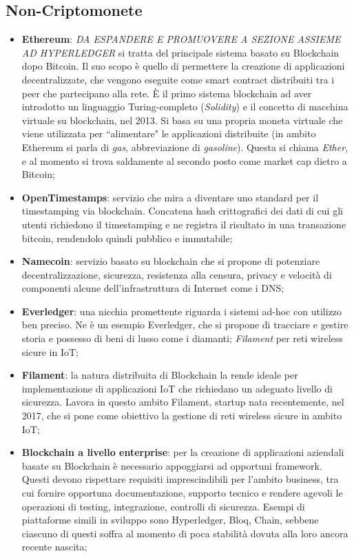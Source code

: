     \subsection{Non-Criptomonete}
        \begin{itemize}
            \item \textbf{Ethereum}: \emph{DA ESPANDERE E PROMUOVERE A SEZIONE ASSIEME AD HYPERLEDGER} si tratta del principale sistema basato su Blockchain dopo Bitcoin. Il suo scopo è quello di permettere la creazione di applicazioni decentralizzate, che vengono eseguite come smart contract distribuiti tra i peer che partecipano alla rete. È il primo sistema blockchain ad aver introdotto un linguaggio Turing-completo (\emph{Solidity}) e il concetto di macchina virtuale su blockchain, nel 2013. Si basa su una propria moneta virtuale che viene utilizzata per ``alimentare" le applicazioni distribuite (in ambito Ethereum si parla di \emph{gas}, abbreviazione di \emph{gasoline}). Questa si chiama \emph{Ether}, e al momento si trova saldamente al secondo posto come market cap dietro a Bitcoin;
            \item \textbf{OpenTimestamps}: servizio che mira a diventare uno standard per il timestamping via blockchain. Concatena hash crittografici dei dati di cui gli utenti richiedono il timestamping e ne registra il risultato in una transazione bitcoin, rendendolo quindi pubblico e immutabile;
            \item \textbf{Namecoin}: servizio basato su blockchain che si propone di potenziare decentralizzazione, sicurezza, resistenza alla censura, privacy e velocità di componenti alcune dell'infrastruttura di Internet come i DNS;
            \item \textbf{Everledger}: una nicchia promettente riguarda i sistemi ad-hoc con utilizzo ben preciso. Ne è un esempio Everledger, che si propone di tracciare e gestire storia e possesso di beni di lusso come i diamanti; \emph{Filament} per reti wireless sicure in IoT;
            \item \textbf{Filament}: la natura distribuita di Blockchain la rende ideale per implementazione di applicazioni IoT che richiedano un adeguato livello di sicurezza. Lavora in questo ambito Filament, startup nata recentemente, nel 2017, che si pone come obiettivo la gestione di reti wireless sicure in ambito IoT;
            \item \textbf{Blockchain a livello enterprise}: per la creazione di applicazioni aziendali basate su Blockchain è necessario appoggiarsi ad opportuni framework. Questi devono rispettare requisiti imprescindibili per l'ambito business, tra cui fornire opportuna documentazione, supporto tecnico e rendere agevoli le operazioni di testing, integrazione, controlli di sicurezza. Esempi di piattaforme simili in sviluppo sono Hyperledger, Bloq, Chain, sebbene ciascuno di questi soffra al momento di poca stabilità dovuta alla loro ancora recente nascita;

\end{itemize}
